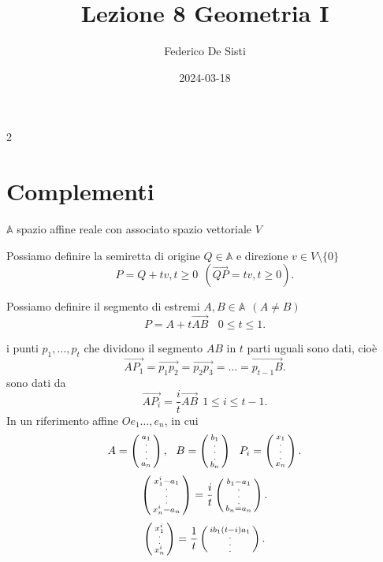 \documentclass[12px]{article}
\title{Lezione 8 Geometria I}
\date{2024-03-18}
\author{Federico De Sisti}
\begin{document}
2
	\maketitle
	\newpage
	\section{Complementi}
	$ \mathbb{A} $ spazio affine reale con associato spazio vettoriale $V$\\
	\begin{defi}[Semiretta]
		Possiamo definire la semiretta di origine $Q\in \mathbb{A} $ e direzione $v\in V\setminus \{0\}$
		\[
		P = Q + tv, t\geq 0\ \ (\overrightarrow{QP} = tv, t\geq 0)
		.\] 
	\end{defi}
	\begin{defi}[Segmento]
		Possiamo definire il segmento di estremi $A, B\in \mathbb{A} \ \ (A\neq B) $
		\[
		P = A + t \overrightarrow{AB} \ \ \ \ 0\leq t\leq 1
		.\] 	
	\end{defi}
	i punti $p_1,\ldots,p_t$ che dividono il segmento $AB$ in $t$ parti uguali sono dati, cioè
\[
	\overrightarrow{AP_1} = \overrightarrow{p_1p_2} = \overrightarrow{p_2p_3} = \ldots = \overrightarrow{p_{t-1}B}
.\] 
sono dati da \[
	\overrightarrow{AP_i} = \frac{i}{t}\overrightarrow{AB} \ \ 1 \leq i\leq t-1
.\] 
	In un riferimento affine $Oe_1\ldots,e_n$, in cui
	\[
		A = \icol{a_1\\ . \\.\\.\\ a_n}, \ \ B = \icol{b_1\\ .\\.\\.\\b_n} \ \ P_i = \icol{x_1\\.\\.\\.\\ x_n}
	.\] 
	\[
		\left(\begin{smallmatrix}x_1^i - a_1\\.\\.\\.\\x_n^i - a_n\end{smallmatrix}\right) = \frac{i}{t}\left(\begin{smallmatrix}b_1-a_1\\.\\.\\.\\ b_n = a_n\end{smallmatrix}\right)
	.\] 
	\[
		\left(\begin{smallmatrix}x_1^i\\.\\.\\x_n^i\end{smallmatrix}\right) = \frac{1}{t}\left(\begin{smallmatrix}ib_1 (t - i)a_1\\.\\.\\.\end{smallmatrix}\right)
	.\] 
\end{document}
